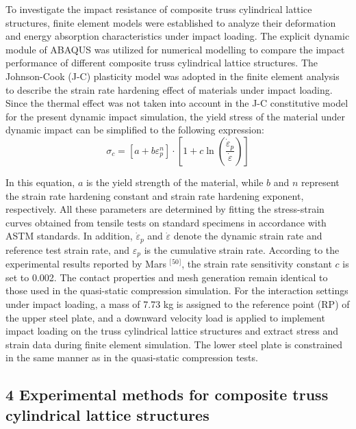 \documentclass{article} %
\begin{document}
To investigate the impact resistance of composite truss cylindrical lattice structures, finite element models were established to analyze their deformation and energy absorption characteristics under impact loading. The explicit dynamic module of ABAQUS was utilized for numerical modelling to compare the impact performance of different composite truss cylindrical lattice structures. The Johnson-Cook (J-C) plasticity model was adopted in the finite element analysis to describe the strain rate hardening effect of materials under impact loading. Since the thermal effect was not taken into account in the J-C constitutive model for the present dynamic impact simulation, the yield stress of the material under dynamic impact can be simplified to the following expression:
\begin{equation} \label{GrindEQ__30_} 
\sigma _{c} =\left[a+b\varepsilon _{p}^{n} \right]\cdot \left[1+c\ln \left(\frac{\dot{\varepsilon }_{p} }{\dot{\varepsilon }} \right)\right] 
\end{equation} 

In this equation, $a$ is the yield strength of the material, while $b$ and $n$ represent the strain rate hardening constant and strain rate hardening exponent, respectively. All these parameters are determined by fitting the stress-strain curves obtained from tensile tests on standard specimens in accordance with ASTM standards. In addition, $\dot{\varepsilon }_{p} $ and $\dot{\varepsilon }$ denote the dynamic strain rate and reference test strain rate, and $\varepsilon _{p} $ is the cumulative strain rate. According to the experimental results reported by Mars ${}^{[}$${}^{50}$${}^{]}$, the strain rate sensitivity constant $c$ is set to 0.002. The contact properties and mesh generation remain identical to those used in the quasi-static compression simulation. For the interaction settings under impact loading, a mass of 7.73 kg is assigned to the reference point (RP) of the upper steel plate, and a downward velocity load is applied to implement impact loading on the truss cylindrical lattice structures and extract stress and strain data during finite element simulation. The lower steel plate is constrained in the same manner as in the quasi-static compression tests.

\noindent 
\subsection{4 Experimental methods for composite truss cylindrical lattice structures}
\end{document}
